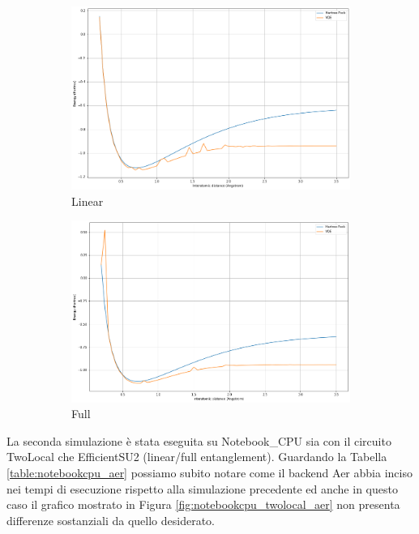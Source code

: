 \begin{figure}[h]
    \begin{subfigure}[h]{0.49\linewidth}
        \includegraphics[width=0.80\linewidth]{Images/Capitolo3/Plots/H2_efficientsu2_linear_aer_cpu_plot.png}
        \caption{Linear}
    \end{subfigure}
    \hfill
    \begin{subfigure}[h]{0.49\linewidth}
        \includegraphics[width=0.80\linewidth]{Images/Capitolo3/Plots/H2_efficientsu2_full_aer_cpu_plot.png}
        \caption{Full}
    \end{subfigure}%
    \caption[Grafico 3 \newline EfficientSU2 - L\_BFGS\_B - Notebook\_CPU - Aer.]{}
    \label{fig:notebookcpu_efficientsu2_aer}
\end{figure}
\newline
La seconda simulazione è stata eseguita su Notebook\_CPU sia con il circuito TwoLocal che EfficientSU2 (linear/full entanglement).
Guardando la Tabella \ref{table:notebookcpu_aer} possiamo subito notare come il backend Aer abbia inciso nei tempi di esecuzione rispetto alla simulazione precedente ed anche in questo caso il grafico mostrato in Figura \ref{fig:notebookcpu_twolocal_aer} non presenta differenze sostanziali da quello desiderato.
